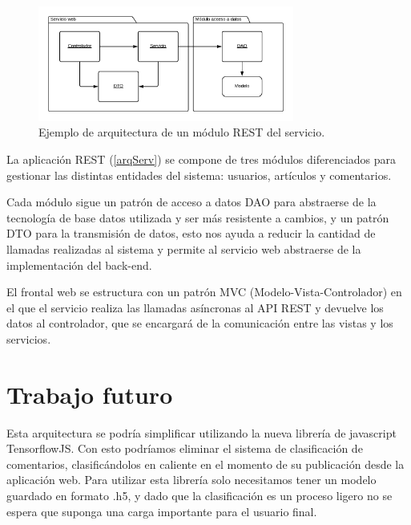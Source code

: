 \begin{figure}[H]
	\centering
	\includegraphics[width=0.75\textwidth]{imaxes/restmodel.png}
	\caption{Ejemplo de arquitectura de un módulo REST del servicio.}
	\label{restModel}
\end{figure}

La aplicación REST (\ref{arqServ}) se compone de tres módulos diferenciados para gestionar las distintas entidades del sistema: usuarios, artículos y comentarios.

Cada módulo sigue un patrón de acceso a datos DAO para abstraerse de la tecnología de base datos utilizada y ser más resistente a cambios, y un patrón DTO para la transmisión de datos, esto nos ayuda a reducir la cantidad de llamadas realizadas al sistema y permite al servicio web abstraerse de la implementación del back-end.

El frontal web se estructura con un patrón MVC (Modelo-Vista-Controlador) en el que el servicio realiza las llamadas asíncronas al API REST y devuelve los datos al controlador, que se encargará de la comunicación entre las vistas y los servicios.

\section{Trabajo futuro} Esta arquitectura se podría simplificar utilizando la nueva librería de javascript TensorflowJS. Con esto podríamos eliminar el sistema de clasificación de comentarios, clasificándolos en caliente en el momento de su publicación desde la aplicación web. 
Para utilizar esta librería solo necesitamos tener un modelo guardado en formato .h5, y dado que la clasificación es un proceso ligero no se espera que suponga una carga importante para el usuario final.

